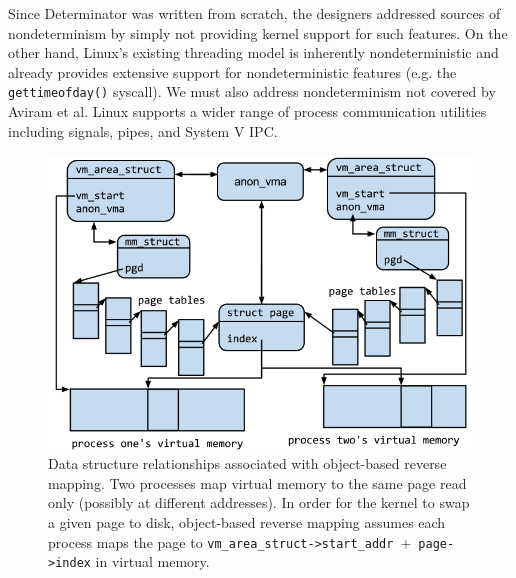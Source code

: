 \begin{itemize}

Since Determinator was
written from scratch, the designers addressed sources of nondeterminism by
simply not providing kernel support for such features. On the other hand,
Linux's existing threading model is inherently nondeterministic and already
provides extensive support for nondeterministic features (e.g. the
{\tt gettimeofday()} syscall). We must also address nondeterminism not covered
by Aviram et al. Linux supports a wider range of process communication utilities
including signals, pipes, and System V IPC.

\begin{figure}[t]
\includegraphics[scale=.33]{anon_vma.png}
\caption{Data structure relationships associated with object-based reverse
mapping. Two processes map virtual memory to the same page read only (possibly
at different addresses). In order for the kernel to swap a given page to disk,
object-based reverse mapping assumes each process maps the page to
\mbox{{\tt vm\_area\_struct->start\_addr} + {\tt page->index}} in virtual
memory.}
\label{fig:anon_vma}
\end{figure}


\end{itemize}
